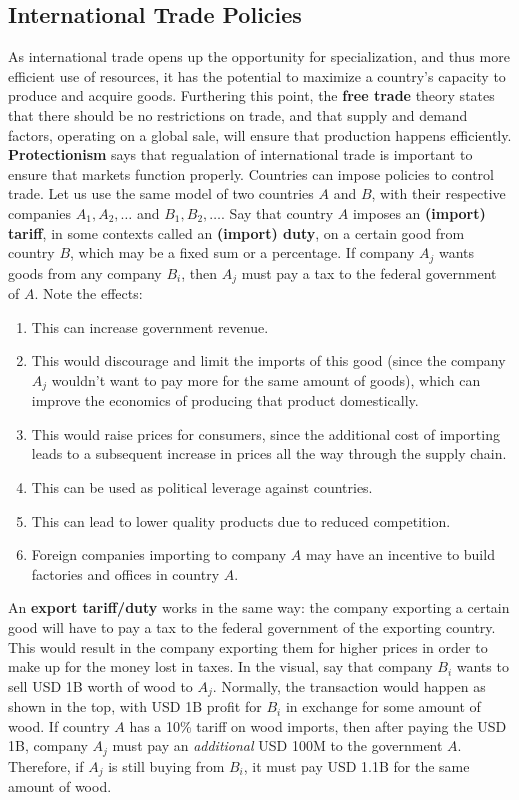 \documentclass{article}
\begin{document}
  \subsection{International Trade Policies}

    As international trade opens up the opportunity for specialization, and thus more efficient use of resources, it has the potential to maximize a country's capacity to produce and acquire goods. Furthering this point, the \textbf{free trade} theory states that there should be no restrictions on trade, and that supply and demand factors, operating on a global sale, will ensure that production happens efficiently. \textbf{Protectionism} says that regualation of international trade is important to ensure that markets function properly. Countries can impose policies to control trade. Let us use the same model of two countries $A$ and $B$, with their respective companies $A_1, A_2, \ldots$ and $B_1, B_2, \ldots$.
    Say that country $A$ imposes an \textbf{(import) tariff}, in some contexts called an \textbf{(import) duty}, on a certain good from country $B$, which may be a fixed sum or a percentage. If company $A_j$ wants goods from any company $B_i$, then $A_j$ must pay a tax to the federal government of $A$. Note the effects:
    \begin{enumerate}
      \item This can increase government revenue.
      \item This would discourage and limit the imports of this good (since the company $A_j$ wouldn't want to pay more for the same amount of goods), which can improve the economics of producing that product domestically.
      \item This would raise prices for consumers, since the additional cost of importing leads to a subsequent increase in prices all the way through the supply chain.
      \item This can be used as political leverage against countries.
      \item This can lead to lower quality products due to reduced competition.
      \item Foreign companies importing to company $A$ may have an incentive to build factories and offices in country $A$.
    \end{enumerate}

    An \textbf{export tariff/duty} works in the same way: the company exporting a certain good will have to pay a tax to the federal government of the exporting country. This would result in the company exporting them for higher prices in order to make up for the money lost in taxes.
    In the visual, say that company $B_i$ wants to sell USD 1B worth of wood to $A_j$. Normally, the transaction would happen as shown in the top, with USD 1B profit for $B_i$ in exchange for some amount of wood. If country $A$ has a 10\% tariff on wood imports, then after paying the USD 1B, company $A_j$ must pay an \textit{additional} USD 100M to the government $A$. Therefore, if $A_j$ is still buying from $B_i$, it must pay USD 1.1B for the same amount of wood.
    \begin{center}
    \end{center}
\end{document}

